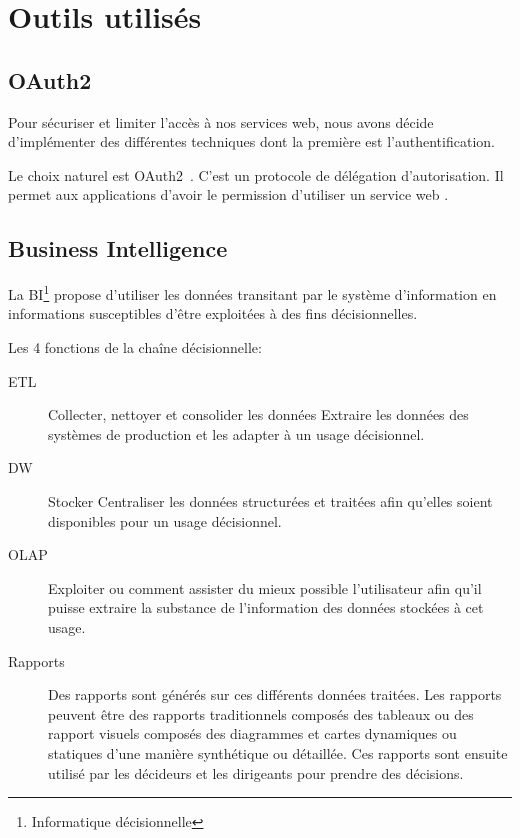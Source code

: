 \section{Outils utilisés}

\subsection{OAuth2}

Pour sécuriser et limiter l'accès à nos services web, nous avons décide
d'implémenter des différentes techniques dont la première est
l'authentification.

Le choix naturel est OAuth2~\cite{RFC6749}. C'est un protocole de délégation
d'autorisation. Il permet aux applications  d'avoir le
permission d'utiliser un service web .

\subsection{Business Intelligence}

La \acrfull{BI}\footnote{Informatique décisionnelle} propose d'utiliser les
données transitant par le système d'information en informations susceptibles
d'être exploitées à des fins décisionnelles.

Les 4 fonctions de la chaîne décisionnelle:

\begin{description}
    \item [\acrfull{ETL}] Collecter, nettoyer et consolider les données
        Extraire les données des systèmes de production et les adapter à un
        usage décisionnel.
    \item [\acrfull{DW}] Stocker Centraliser les données structurées et
        traitées afin qu'elles soient disponibles pour un usage décisionnel.
    \item [\acrfull{OLAP}] Exploiter ou comment assister du mieux possible
        l'utilisateur afin qu'il puisse extraire la substance de l'information
        des données stockées à cet usage.
    \item [Rapports] Des rapports sont générés sur ces différents données
        traitées. Les rapports peuvent être des rapports traditionnels composés
        des tableaux ou des rapport visuels composés des diagrammes et cartes
        dynamiques ou statiques d'une manière synthétique ou détaillée. Ces
        rapports sont ensuite utilisé par les décideurs et les dirigeants pour
        prendre des décisions.
\end{description}

